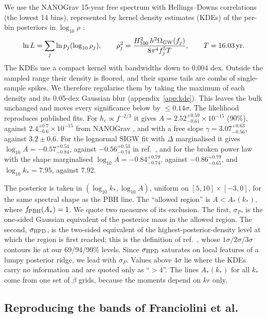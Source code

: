 \documentclass[a4paper,11pt]{article}
\newcommand{\fpbh}{f_{\rm PBH}}
\begin{document}
We use the NANOGrav 15-year free spectrum with Hellings--Downs correlations (the lowest 14 bins),
represented by kernel density estimates (KDEs) of the per-bin posteriors in $\log_{10}\rho$
\cite{Lamb,PTArcade}:
\begin{equation}
\ln L=\sum_j\ln p_j(\log_{10}\rho_j),\qquad
\rho_j^2=\frac{H_{100}^2\,h^2\Omega_{\rm GW}(f_j)}{8\pi^4f_j^5T},\qquad T=16.03\,{\rm yr}.
\label{eq:like}
\end{equation}
The KDEs use a compact kernel with bandwidths down to 0.004 dex. Outside the sampled range their
density is floored, and their sparse tails are combs of single-sample spikes. We therefore
regularise them by taking the maximum of each density and its 0.05-dex Gaussian blur
(appendix~\ref{app:kde}). This leaves the bulk unchanged and moves every significance below by
$\le0.14\sigma$. The likelihood reproduces published fits. For $h_c\propto f^{-2/3}$ it gives
$A=2.52^{+0.59}_{-0.61}\times10^{-15}$ (90\%), against $2.4^{+0.7}_{-0.6}\times10^{-15}$ from
NANOGrav \cite{NG15gwb}, and with a free slope $\gamma=3.07^{+0.63}_{-0.56}$, against
$3.2\pm0.6$. For the lognormal SIGW fit with $\Delta$ marginalised it gives
$\log_{10}A=-0.57^{+0.54}_{-0.84}$, against $-0.56^{+0.53}_{-0.74}$ in ref.~\cite{FIVT23}, and for
the broken power law with the shape marginalised $\log_{10}A=-0.84^{+0.79}_{-0.74}$, against
$-0.86^{+0.79}_{-0.65}$, and $\log_{10}k_*=7.95$, against 7.92.

The posterior is taken in $(\log_{10}k_*,\log_{10}A)$, uniform on $[5,10]\times[-3,0]$, for the
same spectral shape as the PBH line. The ``allowed region'' is $A<A_*(k_*)$, where
$\fpbh(A_*)=1$. We quote two measures of its exclusion. The first, $\sigma_P$, is the one-sided
Gaussian equivalent of the posterior mass in the allowed region. The second, $\sigma_{\rm HPD}$,
is the two-sided equivalent of the highest-posterior-density level at which the region is first
reached; this is the definition of ref.~\cite{FIVT23}, whose $1\sigma/2\sigma/3\sigma$ contours
lie at our 69/94/99\% levels. Since $\sigma_{\rm HPD}$ saturates on local features of a lumpy
posterior ridge, we lead with $\sigma_P$. Values above $4\sigma$ lie where the KDEs carry no
information and are quoted only as ``$>4$''. The lines $A_*(k_*)$ for all $k_*$ come from one set
of $\beta$ grids, because the moments depend on $kr$ only.

\subsection{Reproducing the bands of Franciolini et al.}
\end{document}
